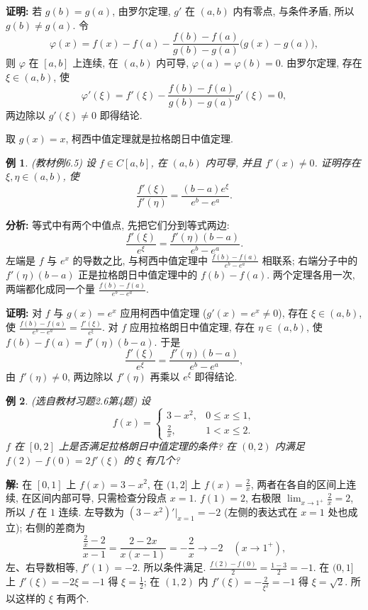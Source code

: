 \documentclass[UTF8,openany]{ctexbook}
\theoremstyle{chinesetextbook}
\newtheorem{example}{例}[section]
\newenvironment{cnproof}{\par\indent\textbf{证明:} \ignorespaces}{\par}
\newenvironment{cnsolution}{\par\indent\textbf{解:} \ignorespaces}{\par}
\begin{document}
\begin{cnproof}
若 $g(b)=g(a)$, 由罗尔定理, $g'$ 在 $(a,b)$ 内有零点, 与条件矛盾, 所以 $g(b)\ne g(a)$. 令
\[
\varphi(x)=f(x)-f(a)-\frac{f(b)-f(a)}{g(b)-g(a)}\bigl(g(x)-g(a)\bigr),
\]
则 $\varphi$ 在 $[a,b]$ 上连续, 在 $(a,b)$ 内可导, $\varphi(a)=\varphi(b)=0$. 由罗尔定理, 存在 $\xi\in(a,b)$, 使
\[
\varphi'(\xi)=f'(\xi)-\frac{f(b)-f(a)}{g(b)-g(a)}g'(\xi)=0,
\]
两边除以 $g'(\xi)\ne0$ 即得结论.
\end{cnproof}
取 $g(x)=x$, 柯西中值定理就是拉格朗日中值定理.
\begin{example}\label{ex:c2-6-5}
\textnormal{(教材例6.5)} 设 $f\in C[a,b]$, 在 $(a,b)$ 内可导, 并且 $f'(x)\ne0$. 证明存在 $\xi,\eta\in(a,b)$, 使
\[
\frac{f'(\xi)}{f'(\eta)}=\frac{(b-a)e^\xi}{e^b-e^a}.
\]
\end{example}
\par\indent\textbf{分析:} 等式中有两个中值点, 先把它们分到等式两边:
\[
\frac{f'(\xi)}{e^\xi}=\frac{f'(\eta)(b-a)}{e^b-e^a}.
\]
左端是 $f$ 与 $e^x$ 的导数之比, 与柯西中值定理中 $\displaystyle\frac{f(b)-f(a)}{e^b-e^a}$ 相联系; 右端分子中的 $f'(\eta)(b-a)$ 正是拉格朗日中值定理中的 $f(b)-f(a)$. 两个定理各用一次, 两端都化成同一个量 $\displaystyle\frac{f(b)-f(a)}{e^b-e^a}$.
\begin{cnproof}
对 $f$ 与 $g(x)=e^x$ 应用柯西中值定理 ($g'(x)=e^x\ne0$), 存在 $\xi\in(a,b)$, 使 $\displaystyle\frac{f(b)-f(a)}{e^b-e^a}=\frac{f'(\xi)}{e^\xi}$. 对 $f$ 应用拉格朗日中值定理, 存在 $\eta\in(a,b)$, 使 $f(b)-f(a)=f'(\eta)(b-a)$. 于是
\[
\frac{f'(\xi)}{e^\xi}=\frac{f'(\eta)(b-a)}{e^b-e^a},
\]
由 $f'(\eta)\ne0$, 两边除以 $f'(\eta)$ 再乘以 $e^\xi$ 即得结论.
\end{cnproof}
\begin{example}\label{ex:c2-h6-4}
\textnormal{(选自教材习题2.6第4题)} 设
\[
f(x)=\begin{cases}3-x^2,&0\le x\le1,\\\frac2x,&1<x\le2.\end{cases}
\]
$f$ 在 $[0,2]$ 上是否满足拉格朗日中值定理的条件? 在 $(0,2)$ 内满足 $f(2)-f(0)=2f'(\xi)$ 的 $\xi$ 有几个?
\end{example}
\begin{cnsolution}
在 $[0,1]$ 上 $f(x)=3-x^2$, 在 $(1,2]$ 上 $\displaystyle f(x)=\frac2x$, 两者在各自的区间上连续, 在区间内部可导, 只需检查分段点 $x=1$. $f(1)=2$, 右极限 $\displaystyle\lim_{x\to1^+}\frac2x=2$, 所以 $f$ 在 $1$ 连续. 左导数为 $(3-x^2)'\big|_{x=1}=-2$ (左侧的表达式在 $x=1$ 处也成立); 右侧的差商为
\[
\frac{\frac2x-2}{x-1}=\frac{2-2x}{x(x-1)}=-\frac2x\to-2\quad(x\to1^+),
\]
左、右导数相等, $f'(1)=-2$. 所以条件满足. $\displaystyle\frac{f(2)-f(0)}2=\frac{1-3}2=-1$. 在 $(0,1]$ 上 $f'(\xi)=-2\xi=-1$ 得 $\displaystyle\xi=\frac12$; 在 $(1,2)$ 内 $\displaystyle f'(\xi)=-\frac2{\xi^2}=-1$ 得 $\xi=\sqrt2$. 所以这样的 $\xi$ 有两个.
\end{cnsolution}
\end{document}
